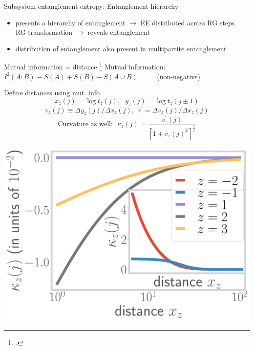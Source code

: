 \documentclass[8pt,aspectratio=169]{beamer}
\begin{document}
\begin{frame}{Subsystem entanglement entropy: Entanglement hierarchy}
\vspace*{\fill}

\begin{itemize}
	\item 
presents a \alert{hierarchy} of entanglement \(\longrightarrow\) EE distributed across RG steps\\
RG transformation \(\longrightarrow\) reveals entanglement

\vspace*{\fill}
\item distribution of entanglement also present in \alert{multipartite} entanglement
\end{itemize}

\end{frame}

\begin{frame}{Mutual information = distance}
\footcite{van2010building,lee2016,anirban_mott_2022,lee2010,lee2014,qi2013,lee2016,anirbanurg1,anirbanurg2,ryu2006,ryu2006aspects,nozaki2012}
\alert{Mutual information}: ~ \(I^2(A:B) \equiv S(A) + S(B) - S(A \cup B)\) ~ ~ ~ (non-negative)\\[10pt]

	\begin{minipage}{0.5\textwidth}
	Define distances using mut. info.
	\[x_z(j) = \log t_z(j),~ ~ ~y_z(j) = \log t_z(j \pm 1)\]
	\[v_z(j) \equiv \Delta y_z(j)/\Delta x_z(j), ~~ v^\prime = \Delta v_z(j)/\Delta x_z(j)\]
	\[\text{Curvature as well:} ~ ~ ~\kappa_{z}(j) = \frac{v^\prime_z(j)}{\left[1 + v_z(j)^2\right]^\frac{3}{2}}\]
	\end{minipage}
	\begin{minipage}{0.49\textwidth}
		\includegraphics[width=\textwidth]{curvature-pos.pdf}
	\end{minipage}
\end{frame}
\end{document}
